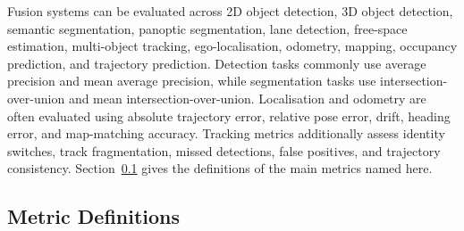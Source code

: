\documentclass[graybox,envcountchap]{style/SNmono}
\begin{document}
Fusion systems can be evaluated across 2D object detection, 3D object detection, semantic segmentation, panoptic segmentation, lane detection, free-space estimation, multi-object tracking, ego-localisation, odometry, mapping, occupancy prediction, and trajectory prediction. Detection tasks commonly use average precision and mean average precision, while segmentation tasks use intersection-over-union and mean intersection-over-union. Localisation and odometry are often evaluated using absolute trajectory error, relative pose error, drift, heading error, and map-matching accuracy. Tracking metrics additionally assess identity switches, track fragmentation, missed detections, false positives, and trajectory consistency. Section~\ref{subsec:metrics} gives the definitions of the main metrics named here.

\subsection{Metric Definitions}
\label{subsec:metrics}
\end{document}
